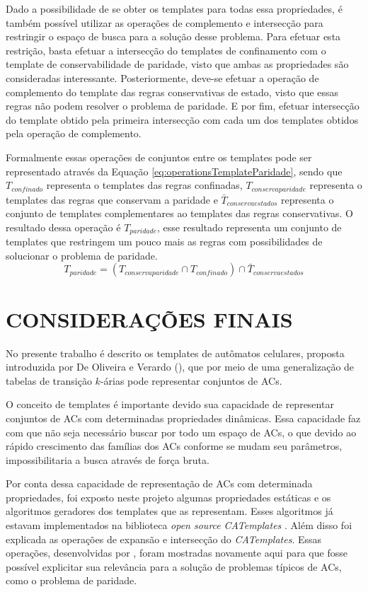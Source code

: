\documentclass[12pt,a4paper]{article}
\let\stdsection\section
\renewcommand\section{\newpage\stdsection}
\begin{document}
	Dado a possibilidade de se obter os templates para todas essa propriedades, é também possível utilizar as operações de complemento e intersecção para restringir o espaço de busca para a solução desse problema.
	Para efetuar esta restrição, basta efetuar a intersecção do templates de confinamento com o template de conservabilidade de paridade, visto que ambas as propriedades são consideradas interessante. 
	Posteriormente, deve-se efetuar a operação de complemento do template das regras conservativas de estado, visto que essas regras não podem resolver o problema de paridade. 
	E por fim, efetuar intersecção do template obtido pela primeira intersecção com cada um dos templates obtidos pela operação de complemento.

	Formalmente essas operações de conjuntos entre os templates pode ser representado através da Equação \ref{eq:operationsTemplateParidade}, sendo que $T_{confinado}$ representa o templates das regras confinadas, $T_{conservaparidade}$ representa o templates das regras que conservam a paridade e $\bar{T}_{conservaestados}$ representa o conjunto de templates complementares ao templates das regras conservativas. O resultado dessa operação é $T_{paridade}$, esse resultado representa um conjunto de templates que restringem um pouco mais as regras com possibilidades de solucionar o problema de paridade.
	\begin{equation}
	T_{paridade} = (T_{conservaparidade} \cap T_{confinado}) \cap \bar{T}_{conservaestados}
	\label{eq:operationsTemplateParidade}
	\end{equation}

\section{CONSIDERAÇÕES FINAIS}\label{sec:conclusao}
No presente trabalho é descrito os templates de autômatos celulares, proposta introduzida por De Oliveira e Verardo (\citeyear{deOliveira2014}), que por meio de uma generalização de tabelas de transição $k$-árias pode representar conjuntos de ACs.

O conceito de templates é importante devido sua capacidade de representar conjuntos de ACs com determinadas propriedades dinâmicas. Essa capacidade faz com que não seja necessário buscar por todo um espaço de ACs, o que devido ao rápido crescimento das famílias dos ACs conforme se mudam seu parâmetros, impossibilitaria a busca através de força bruta.

Por conta dessa capacidade de representação de ACs com determinada propriedades, foi exposto neste projeto algumas propriedades estáticas e os algoritmos geradores dos templates que as representam. Esses algoritmos já estavam implementados na biblioteca \textit{open source} \textit{CATemplates} \cite{CATemplates}. Além disso foi explicada as operações de expansão e intersecção do \textit{CATemplates}. Essas operações, desenvolvidas por , foram mostradas novamente aqui para que fosse possível explicitar sua relevância para a solução de problemas típicos de ACs, como o problema de paridade.
\end{document}
